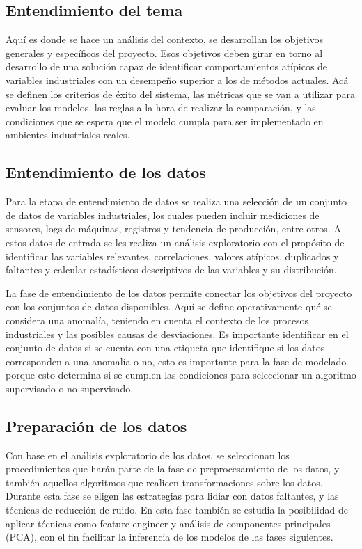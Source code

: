 \documentclass[11pt,a4paper,spanish]{book}
\numberwithin{equation}{chapter}
\numberwithin{figure}{chapter}
\begin{document}
\subsection{Entendimiento del tema}

Aquí es donde se hace un análisis del contexto, se desarrollan los objetivos generales 
y específicos del proyecto. Esos objetivos deben girar en torno al desarrollo de una 
solución capaz de identificar comportamientos atípicos de variables industriales con un 
desempeño superior a los de métodos actuales. Acá se definen los criterios de éxito del
sistema, las métricas que se van a utilizar para evaluar los modelos, las reglas a la 
hora de realizar la comparación, y las condiciones que se espera que el modelo cumpla 
para ser implementado en ambientes industriales reales. 


\subsection{Entendimiento de los datos}


Para la etapa de entendimiento de datos se realiza una selección de un conjunto de datos
de variables industriales, los cuales pueden incluir mediciones de sensores, logs de 
máquinas, registros y tendencia de producción, entre otros. A estos datos de entrada se 
les realiza un análisis exploratorio con el propósito de identificar las variables 
relevantes, correlaciones, valores atípicos, duplicados y faltantes y calcular 
estadísticos descriptivos de las variables y su distribución.


La fase de entendimiento de los datos permite conectar los objetivos del proyecto con 
los conjuntos de datos disponibles. Aquí se define operativamente qué se considera una 
anomalía, teniendo en cuenta el contexto de los procesos industriales y las posibles 
causas de desviaciones. Es importante identificar en el conjunto de datos si se cuenta 
con una etiqueta que identifique si los datos corresponden a una anomalía o no, esto es 
importante para la fase de modelado porque esto determina si se cumplen las condiciones 
para seleccionar un algoritmo supervisado o no supervisado. 

\subsection{Preparación de los datos}


Con base en el análisis exploratorio de los datos, se seleccionan los procedimientos 
que harán parte de la fase de preprocesamiento de los datos, y también aquellos 
algoritmos que realicen transformaciones sobre los datos. Durante esta fase se eligen 
las estrategias para lidiar con datos faltantes, y las técnicas de reducción de ruido. 
En esta fase también se estudia la posibilidad de aplicar técnicas como feature engineer 
y análisis de componentes principales (PCA),  con el fin facilitar la inferencia de los 
modelos de las fases siguientes.
\end{document}
